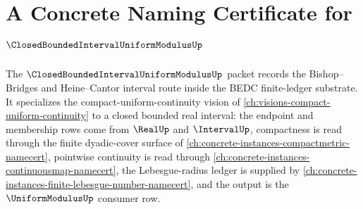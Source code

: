 \chapter{A Concrete Naming Certificate for $\ClosedBoundedIntervalUniformModulusUp$}
\label{ch:concrete-instances-closed-bounded-interval-uniform-modulus-namecert}

The $\ClosedBoundedIntervalUniformModulusUp$ packet records the Bishop--Bridges and Heine--Cantor interval route inside the BEDC finite-ledger substrate. It specializes the compact-uniform-continuity vision of \autoref{ch:visions-compact-uniform-continuity} to a closed bounded real interval: the endpoint and membership rows come from $\RealUp$ and $\IntervalUp$, compactness is read through the finite dyadic-cover surface of \autoref{ch:concrete-instances-compactmetric-namecert}, pointwise continuity is read through \autoref{ch:concrete-instances-continuousmap-namecert}, the Lebesgue-radius ledger is supplied by \autoref{ch:concrete-instances-finite-lebesgue-number-namecert}, and the output is the $\UniformModulusUp$ consumer row.

